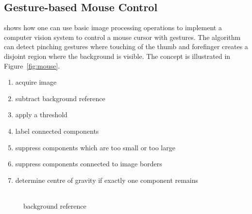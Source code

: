 \documentclass[12pt,a4paper,oneside,openright]{book}
\newcommand{\fig}[1]{Figure~\ref{fig:#1}}
\begin{document}
\begin{CJK}{UTF8}{}
\subsection{Gesture-based Mouse Control}
\citet{wilson2006robust} shows how one can use basic image processing operations to implement a computer vision system to control a mouse cursor with gestures. The algorithm can detect pinching gestures where touching of the thumb and forefinger creates a disjoint region where the background is visible. The concept is illustrated in \fig{mouse}.
\begin{enumerate}
\item acquire image
\item subtract background reference
\item apply a threshold
\item label connected components
\item suppress components which are too small or too large
\item suppress components connected to image borders
\item determine centre of gravity if exactly one component remains
\end{enumerate}
\begin{figure}[htbp]
  \begin{center}
    \begin{minipage}[t]{.32\textwidth}
      \begin{center}
        \\
        background reference
      \end{center}
    \end{minipage}
    \begin{minipage}[t]{.32\textwidth}
      \begin{center}
        \\

\end{center}
\end{minipage}
\end{center}
\end{figure}
\end{CJK}
\end{document}

